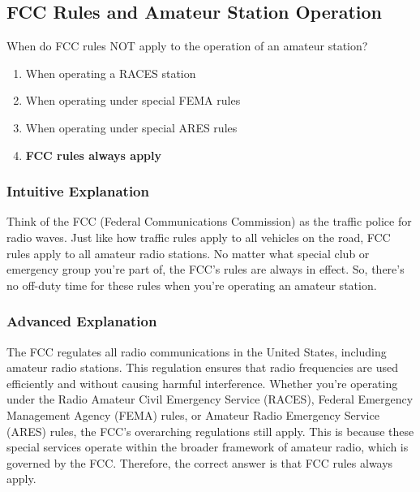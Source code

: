 \subsection{FCC Rules and Amateur Station Operation}
\label{T2C01}

\begin{tcolorbox}[colback=gray!10!white,colframe=black!75!black,title=T2C01]
When do FCC rules NOT apply to the operation of an amateur station?
\begin{enumerate}[noitemsep]
    \item When operating a RACES station
    \item When operating under special FEMA rules
    \item When operating under special ARES rules
    \item \textbf{FCC rules always apply}
\end{enumerate}
\end{tcolorbox}

\subsubsection*{Intuitive Explanation}
Think of the FCC (Federal Communications Commission) as the traffic police for radio waves. Just like how traffic rules apply to all vehicles on the road, FCC rules apply to all amateur radio stations. No matter what special club or emergency group you're part of, the FCC's rules are always in effect. So, there's no off-duty time for these rules when you're operating an amateur station.

\subsubsection*{Advanced Explanation}
The FCC regulates all radio communications in the United States, including amateur radio stations. This regulation ensures that radio frequencies are used efficiently and without causing harmful interference. Whether you're operating under the Radio Amateur Civil Emergency Service (RACES), Federal Emergency Management Agency (FEMA) rules, or Amateur Radio Emergency Service (ARES) rules, the FCC's overarching regulations still apply. This is because these special services operate within the broader framework of amateur radio, which is governed by the FCC. Therefore, the correct answer is that FCC rules always apply.